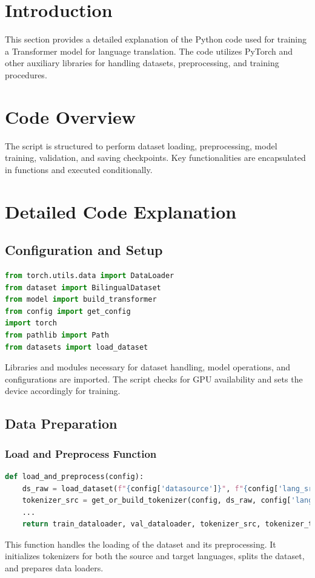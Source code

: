 \documentclass[
12pt, %
oneside, %
english, %
onehalfspacing, %
nolistspacing, %
liststotoc, %
headsepline, %
]{ProposalAndThesis} %
\begin{document}
\vfill
\pagebreak

\tableofcontents %

\listoffigures %

\mainmatter %


\section{Introduction}
This section provides a detailed explanation of the Python code used for training a Transformer model for language translation. The code utilizes PyTorch and other auxiliary libraries for handling datasets, preprocessing, and training procedures.

\section{Code Overview}
The script is structured to perform dataset loading, preprocessing, model training, validation, and saving checkpoints. Key functionalities are encapsulated in functions and executed conditionally.

\section{Detailed Code Explanation}
\subsection{Configuration and Setup}
\begin{lstlisting}[language=Python]
from torch.utils.data import DataLoader
from dataset import BilingualDataset
from model import build_transformer
from config import get_config
import torch
from pathlib import Path
from datasets import load_dataset
\end{lstlisting}
Libraries and modules necessary for dataset handling, model operations, and configurations are imported. The script checks for GPU availability and sets the device accordingly for training.

\subsection{Data Preparation}
\subsubsection{Load and Preprocess Function}
\begin{lstlisting}[language=Python]
def load_and_preprocess(config):
    ds_raw = load_dataset(f"{config['datasource']}", f"{config['lang_src']}-{config['lang_tgt']}", split='train')
    tokenizer_src = get_or_build_tokenizer(config, ds_raw, config['lang_src'])
    ...
    return train_dataloader, val_dataloader, tokenizer_src, tokenizer_tgt
\end{lstlisting}
This function handles the loading of the dataset and its preprocessing. It initializes tokenizers for both the source and target languages, splits the dataset, and prepares data loaders.
\end{document}
